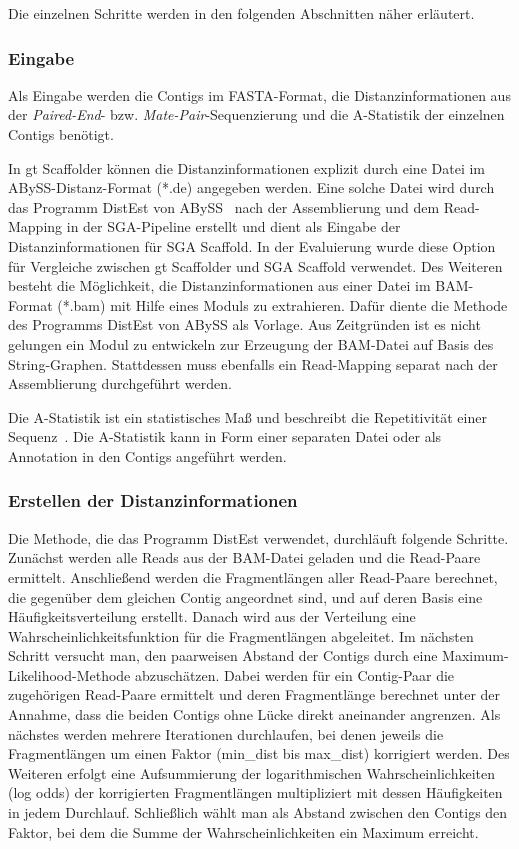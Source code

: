 \documentclass[a4paper,11pt,parskip,abstract=on]{scrartcl}
\begin{document}
Die einzelnen Schritte werden in den folgenden Abschnitten näher erläutert.

\subsubsection{Eingabe}
Als Eingabe werden die Contigs im FASTA-Format, die
Distanzinformationen aus der \textit{Paired-End}-
bzw. \textit{Mate-Pair}-Sequenzierung und die A-Statistik der einzelnen
Contigs benötigt.

In gt Scaffolder können die Distanzinformationen explizit durch eine
Datei im ABySS-Distanz-Format (*.de) angegeben werden. Eine solche
Datei wird durch das Programm DistEst von ABySS~\cite{abyss} nach der Assemblierung
und dem Read-Mapping in der SGA-Pipeline erstellt und dient als
Eingabe der Distanzinformationen für SGA Scaffold. In der Evaluierung
wurde diese Option für Vergleiche zwischen gt Scaffolder und SGA Scaffold
verwendet. Des Weiteren besteht die Möglichkeit, die Distanzinformationen aus
einer Datei im BAM-Format (*.bam) mit Hilfe eines Moduls zu
extrahieren. Dafür diente die Methode des Programms DistEst von ABySS
als Vorlage. Aus Zeitgründen ist es nicht gelungen ein Modul zu
entwickeln zur Erzeugung der BAM-Datei auf Basis des String-Graphen.
Stattdessen muss ebenfalls ein Read-Mapping separat nach der Assemblierung
durchgeführt werden.

Die A-Statistik ist ein statistisches Maß und beschreibt die Repetitivität
einer Sequenz~\cite{Myers:2005iq}. Die A-Statistik kann in Form einer
separaten Datei oder als Annotation in den Contigs angeführt werden.

\subsubsection{Erstellen der Distanzinformationen}
Die Methode, die das Programm DistEst verwendet, durchläuft folgende
Schritte. Zunächst werden alle Reads aus der BAM-Datei geladen und
die Read-Paare ermittelt. Anschließend werden die Fragmentlängen
aller Read-Paare berechnet, die gegenüber dem gleichen Contig angeordnet sind,
und auf deren Basis eine Häufigkeitsverteilung erstellt.
Danach wird aus der Verteilung eine Wahrscheinlichkeitsfunktion für die
Fragmentlängen abgeleitet. Im nächsten Schritt versucht man, den paarweisen
Abstand der Contigs durch eine Maximum-Likelihood-Methode abzuschätzen.
Dabei werden für ein Contig-Paar die zugehörigen Read-Paare ermittelt und
deren Fragmentlänge berechnet unter der Annahme, dass die beiden Contigs
ohne Lücke direkt aneinander angrenzen. Als nächstes werden mehrere
Iterationen durchlaufen, bei denen jeweils die Fragmentlängen um einen Faktor (min\_dist
bis max\_dist) korrigiert werden. Des Weiteren erfolgt eine Aufsummierung
der logarithmischen Wahrscheinlichkeiten (log odds) der korrigierten
Fragmentlängen multipliziert mit dessen Häufigkeiten in jedem Durchlauf.
Schließlich wählt man als Abstand zwischen den Contigs den Faktor, bei
dem die Summe der Wahrscheinlichkeiten ein Maximum erreicht.
\end{document}
